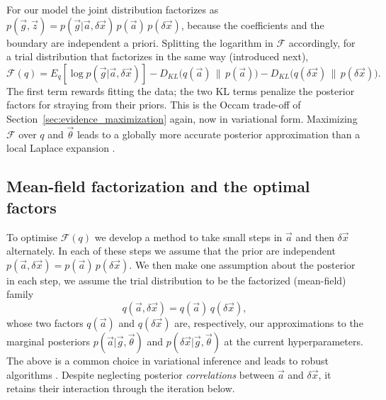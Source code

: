 \documentclass{article}
\begin{document}
For our model the joint distribution factorizes as $p(\vec g, \vec z) = p(\vec g|\vec a, \delta\vec x)\, p(\vec a)\, p(\delta\vec x)$, because the coefficients and the boundary are independent a priori. Splitting the logarithm in $\mathcal F$ accordingly, for a trial distribution that factorizes in the same way (introduced next),
\begin{equation} \label{eq:elbo_model}
    \mathcal F(q) = E_q[\log p(\vec g|\vec a, \delta\vec x)] - D_{KL}\big(q(\vec a)\,\|\,p(\vec a)\big) - D_{KL}\big(q(\delta\vec x)\,\|\,p(\delta\vec x)\big). 
\end{equation}
The first term rewards fitting the data; the two KL terms penalize the posterior factors for straying from their priors. This is the Occam trade-off of Section~\ref{sec:evidence_maximization} again, now in variational form. Maximizing $\mathcal F$ over $q$ and $\vec\theta$ leads to a globally more accurate posterior approximation than a local Laplace expansion \cite[Chapter 10]{bishop2006pattern}.

\subsection{Mean-field factorization and the optimal factors} \label{sec:mean_field}
To optimise $\mathcal F (q)$ we develop a method to take small steps in $\vec a$ and then $\delta \vec x$ alternately. In each of these steps we assume that the prior are independent $p(\vec a, \delta \vec x) = p(\vec a)\, p(\delta \vec x)$. We then make one assumption about the posterior in each step, we assume the trial distribution to be the factorized (mean-field) family
\begin{equation} \label{app:mean_field}
    q(\vec a, \delta\vec x) = q(\vec a)\, q(\delta\vec x),
\end{equation}
whose two factors $q(\vec a)$ and $q(\delta\vec x)$ are, respectively, our approximations to the marginal posteriors $p(\vec a|\vec g,\vec\theta)$ and $p(\delta\vec x|\vec g,\vec\theta)$ at the current hyperparameters. The above is a common choice in variational inference and leads to robust algorithms \cite[Chapter 10]{bishop2006pattern}. Despite neglecting posterior \emph{correlations} between $\vec a$ and $\delta \vec x$, it retains their interaction through the iteration below. 
\end{document}
